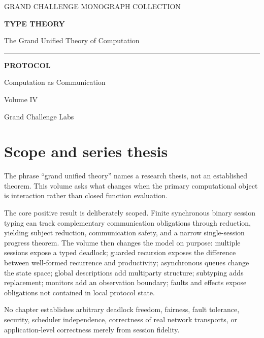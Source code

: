 \documentclass[11pt,openany]{book}
\begin{document}
\frontmatter
\begin{titlepage}
\pagecolor{GCLPale!35}\color{GCLInk}\centering
\vspace*{1.2cm}
{\small\sffamily GRAND CHALLENGE MONOGRAPH COLLECTION\par}
\vspace{1.1cm}
{\Huge\bfseries TYPE THEORY\par}
\vspace{0.25cm}
{\Large The Grand Unified Theory of Computation\par}
\vspace{1cm}
{\color{GCLWarm}\rule{0.76\textwidth}{1.1pt}\par}
\vspace{0.8cm}
{\fontsize{31}{35}\selectfont\bfseries PROTOCOL\par}
\vspace{0.25cm}
{\LARGE Computation as Communication\par}
\vspace{0.25cm}
{\large Volume IV\par}
\vfill
{\large Grand Challenge Labs\par}
\end{titlepage}
\nopagecolor\color{GCLInk}

\chapter*{Scope and series thesis}
The phrase ``grand unified theory'' names a research thesis, not an established theorem.
This volume asks what changes when the primary computational object is interaction rather than
closed function evaluation.

The core positive result is deliberately scoped. Finite synchronous binary session typing can
track complementary communication obligations through reduction, yielding subject reduction,
communication safety, and a narrow single-session progress theorem. The volume then changes the
model on purpose: multiple sessions expose a typed deadlock; guarded recursion exposes the
difference between well-formed recurrence and productivity; asynchronous queues change the state
space; global descriptions add multiparty structure; subtyping adds replacement; monitors add an
observation boundary; faults and effects expose obligations not contained in local protocol state.

No chapter establishes arbitrary deadlock freedom, fairness, fault tolerance, security,
scheduler independence, correctness of real network transports, or application-level correctness
merely from session fidelity.
\end{document}
